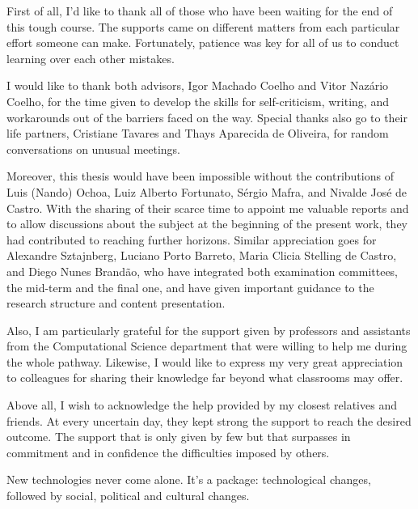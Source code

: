 \noindent
\begin{minipage}{\textwidth}

First of all, I'd like to thank all of those who have been waiting for the end of this tough course.
The supports came on different matters from each particular effort someone can make.
Fortunately, patience was key for all of us to conduct learning over each other mistakes.
\bigskip

I would like to thank both advisors, Igor Machado Coelho and Vitor Nazário Coelho, for the time given to develop the skills for self-criticism, writing, and workarounds out of the barriers faced on the way.
Special thanks also go to their life partners, Cristiane Tavares and Thays Aparecida de Oliveira, for random conversations on unusual meetings.
\bigskip

Moreover, this thesis would have been impossible without the contributions of Luis (Nando) Ochoa, Luiz Alberto Fortunato, Sérgio Mafra, and Nivalde José de Castro.
With the sharing of their scarce time to appoint me valuable reports and to allow discussions about the subject at the beginning of the present work, they had contributed to reaching further horizons.
Similar appreciation goes for Alexandre Sztajnberg, Luciano Porto Barreto, Maria Clicia Stelling de Castro, and Diego Nunes Brandão, who have integrated both examination committees, the mid-term and the final one, and have given important guidance to the research structure and content presentation.
\bigskip

Also, I am particularly grateful for the support given by professors and assistants from the Computational Science department that were willing to help me during the whole pathway.
Likewise, I would like to express my very great appreciation to colleagues for sharing their knowledge far beyond what classrooms may offer.
\bigskip

Above all, I wish to acknowledge the help provided by my closest relatives and friends.
At every uncertain day, they kept strong the support to reach the desired outcome.
The support that is only given by few but that surpasses in commitment and in confidence the difficulties imposed by others.

\end{minipage}
\vfill

\pretextualchapter{}
\vfill

\noindent
New technologies never come alone.
It's a package: technological changes, followed by social, political and cultural changes.

